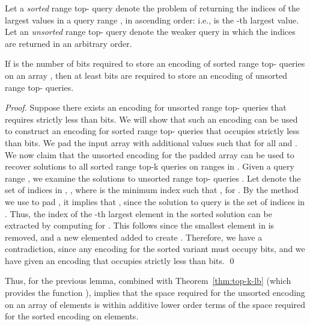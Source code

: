 \documentclass[runningheads]{llncs}
\begin{document}
Let a \emph{sorted} range top- query denote the problem of
returning the indices  of the  largest values in
a query range , in ascending order: i.e.,  is the
-th largest value.  Let an \emph{unsorted} range top- query
denote the weaker query in which the indices  are
returned in an arbitrary order.

\begin{lemma}
If  is the number of bits required to store an
encoding of sorted range top- queries on an array , then
at least  bits are required to store an encoding
of unsorted range top- queries.
\end{lemma}

\begin{proof}
Suppose there exists an encoding for unsorted range top- queries
that requires strictly less than  bits.  We will
show that such an encoding can be used to construct an encoding for
sorted range top- queries that occupies strictly less than
 bits.  We pad the input array  with 
additional values  such that 
for all  and .  We now claim that the
unsorted encoding for the padded array can be used to recover
solutions to all sorted range top-k queries on ranges in .
Given a query range , we examine the solutions to unsorted
range top- queries .  Let
 denote the set of indices in , ,  where  is the minimum
index such that , for .  By the method we use to pad , it implies that , since the solution to query  is
the set of indices in .  Thus, the index of the -th
largest element in the sorted solution can be extracted by computing
 for .  This follows
since the smallest element in  is removed, and a new
elemented added to create .  Therefore, we have a
contradiction, since any encoding for the sorted variant must occupy
 bits, and we have given an encoding that occupies
strictly less than  bits. \qed
\end{proof}

Thus, for  the previous lemma, combined with
Theorem~\ref{thm:top-k-lb} (which provides the function
), implies that the space required for the unsorted
encoding on an array of  elements is within additive lower order
terms of the space required for the sorted encoding on  elements.
\end{document}
